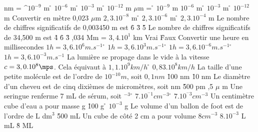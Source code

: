  nm =
\rv
^{$10^{-9}$} m
\r
$10^{-6}$ m
\r
$10^{-3}$ m
\r
$10^{-12}$ m
 $\mu$m =
\r
$10^{-9}$ m
\rv
$10^{-6}$ m
\r
$10^{-3}$ m
\r
$10^{-12}$ m
\q
Convertir en mètre 0,023 $\mu$m
\rv
$2,3. 10^{-8}$ m
\r
$2,3. 10^{-6}$ m
\r
$2,3. 10^{-4}$ m
\q
Le nombre de chiffres significatifs de 0,003450 m est
\r
6
\r
3
\r
5
\q
Le nombre de chiffres significatifs de 34,500 m est
\r
4
\r
6
\r
3
,034 Mm = $3,4.10^1$ km
\rv
Vrai
\r
Faux
\q
Convertir une heure en millisecondes
\rv
$1 h = 3,6.10^6 m.s^{-1}$
\r
$1 h = 3,6.10^3 m.s^{-1}$
\r
$1 h = 3,6.10^{-6} m.s^{-1}$
\r
$1 h = 3,6.10^{-3} m.s^{-1}$
\q
La lumière se propage dans le vide à  la vitesse $c=3,0.10^8\mps$.
Cela équivaut à  
\rv
$1,1.10^9 km/h$
\r
$0,83.10^8 km/h$
\q
La taille d'une petite molécule	est de l'ordre de $10^{-10} m$, soit
\rv
$0,1 nm$
\r
100 nm
\r
10 nm	
\q
Le diamètre d'un cheveu	est de cinq dixièmes de micromètres, soit
 nm
\r
500 pm
,5 $\mu$ m
\q 
Une seringue renferme 7 mL de sérum, soit
 $^{-3}$
\r
$7.10^{^-1}cm^{-3}$
\r
$7.10^{^-3}cm^{-3}$
\q
Un centimètre cube d'eau a pour masse
 g
\r
100 g
\r
$10^{-3}$ g
\q
Le volume d'un ballon de foot est de l'ordre de 
 L
 dm$^{3}$
\r
500 mL
\q
Un cube de côté 2 cm a pour volume
\rv
$8 cm^{-3}$
\rv
$8.10^{-3}$ L 
 mL
\r
8 ML
